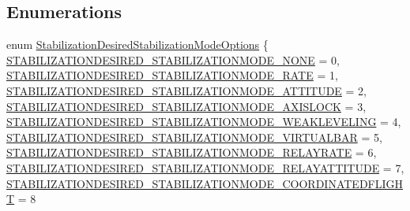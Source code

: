 \subsection*{\-Enumerations}
\begin{DoxyCompactItemize}
\item 
enum \hyperlink{group___stabilization_desired_ga5595dffabb4992c7f8e331ca60912aba}{\-Stabilization\-Desired\-Stabilization\-Mode\-Options} \{ \*
\hyperlink{group___stabilization_desired_gga5595dffabb4992c7f8e331ca60912abaa06759c10782ebd9cd3ef526dae5f43f7}{\-S\-T\-A\-B\-I\-L\-I\-Z\-A\-T\-I\-O\-N\-D\-E\-S\-I\-R\-E\-D\-\_\-\-S\-T\-A\-B\-I\-L\-I\-Z\-A\-T\-I\-O\-N\-M\-O\-D\-E\-\_\-\-N\-O\-N\-E} = 0, 
\hyperlink{group___stabilization_desired_gga5595dffabb4992c7f8e331ca60912abaab0b0ad4505a6b272084471c41e462f26}{\-S\-T\-A\-B\-I\-L\-I\-Z\-A\-T\-I\-O\-N\-D\-E\-S\-I\-R\-E\-D\-\_\-\-S\-T\-A\-B\-I\-L\-I\-Z\-A\-T\-I\-O\-N\-M\-O\-D\-E\-\_\-\-R\-A\-T\-E} = 1, 
\hyperlink{group___stabilization_desired_gga5595dffabb4992c7f8e331ca60912abaab2abd11c617c8498693f4c8cf25e6d61}{\-S\-T\-A\-B\-I\-L\-I\-Z\-A\-T\-I\-O\-N\-D\-E\-S\-I\-R\-E\-D\-\_\-\-S\-T\-A\-B\-I\-L\-I\-Z\-A\-T\-I\-O\-N\-M\-O\-D\-E\-\_\-\-A\-T\-T\-I\-T\-U\-D\-E} = 2, 
\hyperlink{group___stabilization_desired_gga5595dffabb4992c7f8e331ca60912abaa00be7ec077f791b6921be7f841e84f80}{\-S\-T\-A\-B\-I\-L\-I\-Z\-A\-T\-I\-O\-N\-D\-E\-S\-I\-R\-E\-D\-\_\-\-S\-T\-A\-B\-I\-L\-I\-Z\-A\-T\-I\-O\-N\-M\-O\-D\-E\-\_\-\-A\-X\-I\-S\-L\-O\-C\-K} = 3, 
\*
\hyperlink{group___stabilization_desired_gga5595dffabb4992c7f8e331ca60912abaaac06aeb342a2b00a81df4f5a52df7ecf}{\-S\-T\-A\-B\-I\-L\-I\-Z\-A\-T\-I\-O\-N\-D\-E\-S\-I\-R\-E\-D\-\_\-\-S\-T\-A\-B\-I\-L\-I\-Z\-A\-T\-I\-O\-N\-M\-O\-D\-E\-\_\-\-W\-E\-A\-K\-L\-E\-V\-E\-L\-I\-N\-G} = 4, 
\hyperlink{group___stabilization_desired_gga5595dffabb4992c7f8e331ca60912abaa399538586bedfadabc03edbcf87e258b}{\-S\-T\-A\-B\-I\-L\-I\-Z\-A\-T\-I\-O\-N\-D\-E\-S\-I\-R\-E\-D\-\_\-\-S\-T\-A\-B\-I\-L\-I\-Z\-A\-T\-I\-O\-N\-M\-O\-D\-E\-\_\-\-V\-I\-R\-T\-U\-A\-L\-B\-A\-R} = 5, 
\hyperlink{group___stabilization_desired_gga5595dffabb4992c7f8e331ca60912abaaf080df9f09e5912e26ed63302b9bd577}{\-S\-T\-A\-B\-I\-L\-I\-Z\-A\-T\-I\-O\-N\-D\-E\-S\-I\-R\-E\-D\-\_\-\-S\-T\-A\-B\-I\-L\-I\-Z\-A\-T\-I\-O\-N\-M\-O\-D\-E\-\_\-\-R\-E\-L\-A\-Y\-R\-A\-T\-E} = 6, 
\hyperlink{group___stabilization_desired_gga5595dffabb4992c7f8e331ca60912abaa539a62fd87c53e679f34e9b769253031}{\-S\-T\-A\-B\-I\-L\-I\-Z\-A\-T\-I\-O\-N\-D\-E\-S\-I\-R\-E\-D\-\_\-\-S\-T\-A\-B\-I\-L\-I\-Z\-A\-T\-I\-O\-N\-M\-O\-D\-E\-\_\-\-R\-E\-L\-A\-Y\-A\-T\-T\-I\-T\-U\-D\-E} = 7, 
\*
\hyperlink{group___stabilization_desired_gga5595dffabb4992c7f8e331ca60912abaa1efdb27c59c35f8ca46639a6581204be}{\-S\-T\-A\-B\-I\-L\-I\-Z\-A\-T\-I\-O\-N\-D\-E\-S\-I\-R\-E\-D\-\_\-\-S\-T\-A\-B\-I\-L\-I\-Z\-A\-T\-I\-O\-N\-M\-O\-D\-E\-\_\-\-C\-O\-O\-R\-D\-I\-N\-A\-T\-E\-D\-F\-L\-I\-G\-H\-T} = 8

\end{DoxyCompactItemize}
